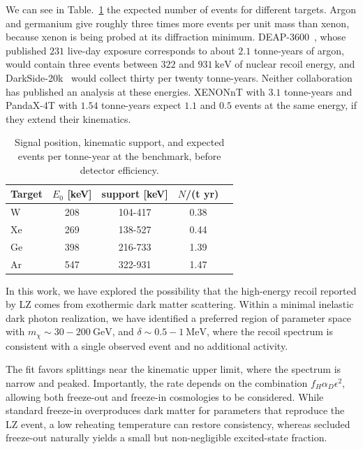 \documentclass[prd,aps,reprint,superscriptaddress,nofootinbib]{revtex4-2}
\newcommand{\keV}{~\text{keV}}
\begin{document}
We can see in Table.~\ref{tab:targets} the expected number of events for different targets.  Argon and germanium give roughly three times more events per unit mass than xenon, because xenon is being probed at its diffraction minimum. DEAP-3600~\cite{DEAP:2019yzn}, whose published $231$ live-day exposure corresponds to about $2.1$ tonne-years of argon, would contain three events between $322$ and $931\keV$ of nuclear recoil energy, and DarkSide-20k~\cite{Manthos:2023swh} would collect thirty per twenty tonne-years. Neither collaboration has published an analysis at these energies.  XENONnT with $3.1$ tonne-years and PandaX-4T with $1.54$ tonne-years expect $1.1$ and $0.5$ events at the same energy, if they extend their kinematics\cite{XENON:2025vwd,PandaX:2024qfu}.

\begin{table}[h!]
\caption{Signal position, kinematic support, and expected events per tonne-year at the benchmark, before detector efficiency. }
\label{tab:targets}
\begin{ruledtabular}
\begin{tabular}{lcccc}
Target & $E_0$ [keV] & support [keV] & $N$/(t yr) \\
\hline
W  & 208 & 104-417 & 0.38 \\
Xe & 269 & 138-527 & 0.44 \\
Ge & 398 & 216-733 & 1.39  \\
Ar & 547 & 322-931 & 1.47 \\
\end{tabular}
\end{ruledtabular}
\end{table}

In this work, we have explored the possibility that the high-energy recoil reported by LZ comes from exothermic dark matter scattering. Within a minimal inelastic dark photon realization, we have identified a preferred region of parameter space with $m_\chi \sim 30-200~\mathrm{GeV}$, and $\delta \sim 0.5-1~\mathrm{MeV}$, where the recoil spectrum is consistent with a single observed event and no additional activity.

The fit favors splittings near the kinematic upper limit, where the spectrum is narrow and peaked. Importantly, the rate depends on the combination $f_H\alpha_D\epsilon^2$, allowing both freeze-out and freeze-in cosmologies to be considered. While standard freeze-in overproduces dark matter for parameters that reproduce the LZ event, a low reheating temperature can restore consistency, whereas secluded freeze-out naturally yields a small but non-negligible excited-state fraction.
\end{document}
